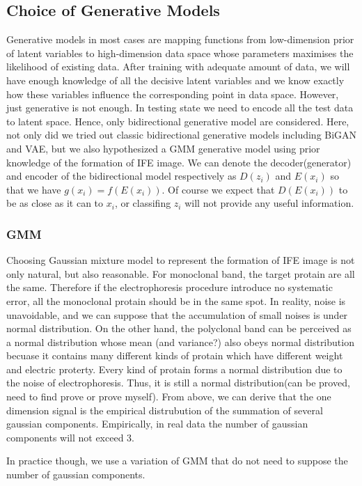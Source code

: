 \documentclass[letterpaper]{article}
\begin{document}
\subsection{Choice of Generative Models}
Generative models in most cases are mapping functions from low-dimension prior of latent variables to high-dimension data space whose parameters maximises the likelihood of existing data\cite{goodfellow2016nips}. After training with adequate amount of data, we will have enough knowledge of all the decisive latent variables and we know exactly how these variables influence the corresponding point in data space. However, just generative is not enough. In testing state we need to encode all the test data to latent space. Hence, only bidirectional generative model are considered. Here, not only did we tried out classic bidirectional generative models including BiGAN and VAE, but we also hypothesized a GMM generative model using prior knowledge of the formation of IFE image. We can denote the decoder(generator) and encoder of the bidirectional model respectively as $D(z_i)$ and $E(x_i)$ so that we have $g(x_i)=f(E(x_i))$. Of course we expect that $D(E(x_i))$ to be as close as it can to $x_i$, or classifing $z_i$ will not provide any useful information.

\subsubsection{GMM}
Choosing Gaussian mixture model to represent the formation of IFE image is not only natural, but also reasonable. For monoclonal band, the target protain are all the same. Therefore if the electrophoresis procedure introduce no systematic error, all the monoclonal protain should be in the same spot. In reality, noise is unavoidable, and we can suppose that the accumulation of small noises is under normal distribution. On the other hand, the polyclonal band can be perceived as a normal distribution whose mean (and variance?) also obeys normal distribution becuase it contains many different kinds of protain which have different weight and electric proterty. Every kind of protain forms a normal distribution due to the noise of electrophoresis. Thus, it is still a normal distribution(can be proved, need to find prove or prove myself). From above, we can derive that the one dimension signal is the empirical distrubution of the summation of several gaussian components. Empirically, in real data the number of gaussian components will not exceed 3.

In practice though, we use a variation of GMM that do not need to suppose the number of gaussian components.
\end{document}

